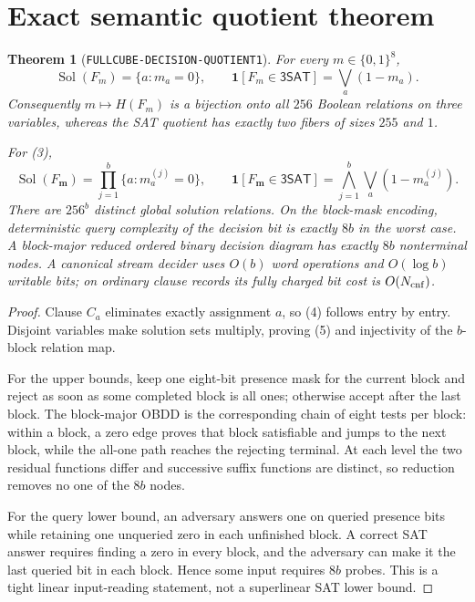 \documentclass[11pt]{article}
\newtheorem{theorem}{Theorem}
\newcommand{\SAT}{\mathsf{3SAT}}
\begin{document}
\section{Exact semantic quotient theorem}

\begin{theorem}[\texttt{FULLCUBE-DECISION-QUOTIENT1}]
For every $m\in\{0,1\}^8$,
\[
 \operatorname{Sol}(F_m)=\{a:m_a=0\},\qquad
 \mathbf 1[F_m\in\SAT]=\bigvee_a(1-m_a).                 \tag{4}
\]
Consequently $m\mapsto H(F_m)$ is a bijection onto all $256$ Boolean
relations on three variables, whereas the SAT quotient has exactly two
fibers of sizes $255$ and $1$.

For (3),
\[
 \operatorname{Sol}(F_{\mathbf m})=
 \prod_{j=1}^b\{a:m^{(j)}_a=0\},\qquad
 \mathbf 1[F_{\mathbf m}\in\SAT]
 =\bigwedge_{j=1}^b\bigvee_a(1-m^{(j)}_a).                \tag{5}
\]
There are $256^b$ distinct global solution relations.  On the block-mask
encoding, deterministic query complexity of the decision bit is exactly
$8b$ in the worst case.  A block-major reduced ordered binary decision
diagram has exactly $8b$ nonterminal nodes.  A canonical stream decider uses
$O(b)$ word operations and $O(\log b)$ writable bits; on ordinary clause
records its fully charged bit cost is $O(N_{\rm cnf})$.
\end{theorem}

\begin{proof}
Clause $C_a$ eliminates exactly assignment $a$, so (4) follows entry by
entry.  Disjoint variables make solution sets multiply, proving (5) and
injectivity of the $b$-block relation map.

For the upper bounds, keep one eight-bit presence mask for the current block
and reject as soon as some completed block is all ones; otherwise accept
after the last block.  The block-major OBDD is the corresponding chain of
eight tests per block: within a block, a zero edge proves that block
satisfiable and jumps to the next block, while the all-one path reaches the
rejecting terminal.  At each level the two residual functions differ and
successive suffix functions are distinct, so reduction removes no one of
the $8b$ nodes.

For the query lower bound, an adversary answers one on queried presence bits
while retaining one unqueried zero in each unfinished block.  A correct SAT
answer requires finding a zero in every block, and the adversary can make it
the last queried bit in each block.  Hence some input requires $8b$ probes.
This is a tight linear input-reading statement, not a superlinear SAT lower
bound.
\end{proof}
\end{document}
